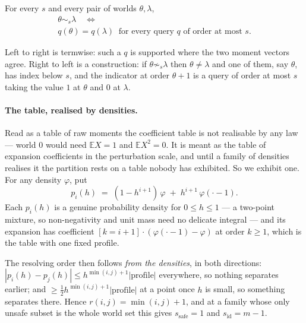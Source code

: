 \begin{theorem}
\label{thm:indist}
For every $s$ and every pair of worlds $\theta,\lambda$,
\begin{gather*}
\theta\sim_{s}\lambda
\quad\Longleftrightarrow\\
q(\theta)=q(\lambda)\ \text{ for every query } q \text{ of order at most } s .
\end{gather*}
\end{theorem}

Left to right is termwise: such a $q$ is supported where the two moment vectors agree.
Right to left is a construction: if $\theta\not\sim_{s}\lambda$ then $\theta\ne\lambda$
and one of them, say $\theta$, has index below $s$, and the indicator at order $\theta+1$
is a query of order at most $s$ taking the value $1$ at $\theta$ and $0$ at $\lambda$.


\paragraph{The table, realised by densities.}
Read as a table of raw moments the coefficient table is not realisable by any law --- world
$0$ would need $\mathbb EX=1$ and $\mathbb EX^{2}=0$. It is meant as the table of expansion
coefficients in the perturbation scale, and until a family of densities realises it the
partition rests on a table nobody has exhibited. So we exhibit one. For any density
$\varphi$, put
\[
p_{i}(h)\;=\;(1-h^{i+1})\,\varphi\;+\;h^{i+1}\,\varphi(\cdot-1).
\]
Each $p_{i}(h)$ is a genuine probability density for $0\le h\le1$ --- a two-point mixture, so
non-negativity and unit mass need no delicate integral --- and its expansion has coefficient
$[k=i+1]\cdot(\varphi(\cdot-1)-\varphi)$ at order $k\ge1$, which is the table with one fixed
profile.

The resolving order then follows \emph{from the densities}, in both directions:
$|p_{i}(h)-p_{j}(h)|\le h^{\min(i,j)+1}|\text{profile}|$ everywhere, so nothing separates
earlier; and $\ge\tfrac12h^{\min(i,j)+1}|\text{profile}|$ at a point once $h$ is small, so
something separates there. Hence $r(i,j)=\min(i,j)+1$, and at a family whose only unsafe
subset is the whole world set this gives $s_{\mathrm{safe}}=1$ and $s_{\mathrm{id}}=m-1$.

